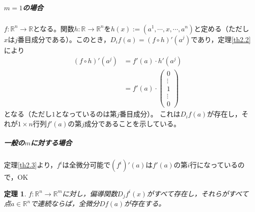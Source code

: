 \documentclass[dvipdfmx,a4j,10pt]{jsarticle}
\makeatletter
\theoremstyle{mystyle1}
\newtheorem{thm}[dfn]{定理}
\theoremstyle{mystyle2}
\renewenvironment{proof}[1][\proofname]{\par
  \pushQED{\qed}%
  \normalfont
  \topsep6\p@\@plus6\p@ \trivlist
  \item[\hskip\labelsep{\bfseries\sffamily #1}]\ignorespaces
}{%
  \popQED\endtrivlist\@endpefalse
}
\renewcommand\proofname{証明}
\makeatother
\begin{document}
\begin{proof}
	\subparagraph{$m=1$の場合}
	$f:\mathbb{R}^n\to\mathbb{R}$となる。関数$h:\mathbb{R}\to\mathbb{R}^n$を$h(x):=(a^1,\cdots,x,\cdots,a^n)$と定める（ただし$x$は$j$番目成分である）。このとき，$D_if(a)=(f\circ h)'(a^j)$であり，定理\ref{th2.2}により
	\[
	\begin{split}
	(f\circ h)'(a^j)&=f'(a)\cdot h'(a^j)\\
	&=f'(a)\cdot\begin{pmatrix} 0 \\ \vdots \\ 1 \\ \vdots \\ 0\end{pmatrix}
	\end{split}
	\]
	となる（ただし$1$となっているのは第$j$番目成分）。
	これは$D_if(a)$が存在し，それが$1\times n$行列$f'(a)$の第$j$成分であることを示している。\footnotemark
	\subparagraph{一般の$m$に対する場合}
	定理\ref{th2.3}より，$f^i$は全微分可能で$(f^i)'(a)$\footnotemark は$f'(a)$の第$i$行になっているので，OK
\end{proof}

\begin{framed}
	\begin{thm}\label{th2.8}
		$f:\mathbb{R}^n\to\mathbb{R}^m$に対し，偏導関数$D_jf^i(x)$がすべて存在し，それらがすべて点$a\in\mathbb{R}^n$で連続ならば，全微分$Df(a)$が存在する。
	\end{thm}
\end{framed}
\end{document}
